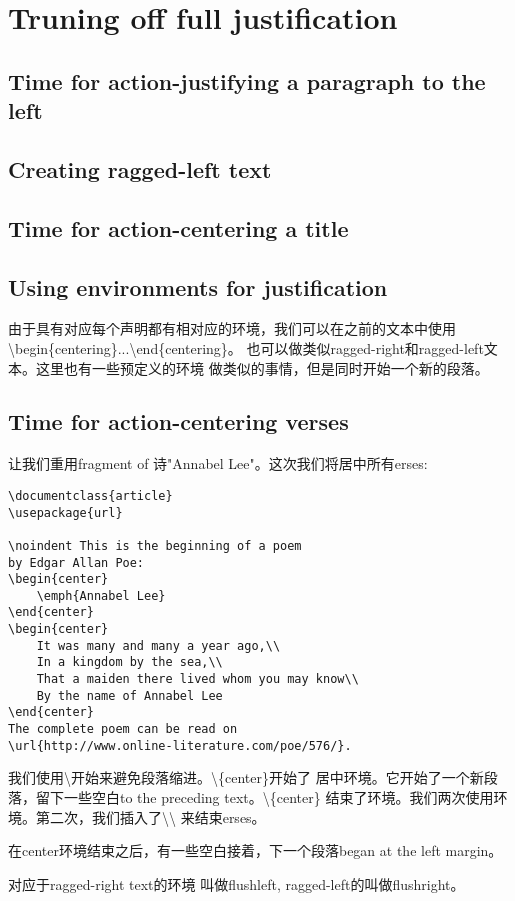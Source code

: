 \section{Truning off full justification}
	\subsection{Time for action-justifying a paragraph to the left}
	\subsection{Creating ragged-left text}
	\subsection{Time for action-centering a title}
	\subsection{Using environments for justification}
由于具有对应每个声明都有相对应的环境，我们可以在之前的文本中使用
\textbackslash begin\{centering\}...\textbackslash end\{centering\}。
也可以做类似ragged-right和ragged-left文本。这里也有一些预定义的环境
做类似的事情，但是同时开始一个新的段落。
	\subsection{Time for action-centering verses}
让我们重用fragment of 诗"Annabel Lee"。这次我们将居中所有erses:
\begin{lstlisting}[language={[LaTeX]TeX}]
\documentclass{article}
\usepackage{url}

\noindent This is the beginning of a poem
by Edgar Allan Poe:
\begin{center}
	\emph{Annabel Lee}
\end{center}
\begin{center}
	It was many and many a year ago,\\
	In a kingdom by the sea,\\
	That a maiden there lived whom you may know\\
	By the name of Annabel Lee
\end{center}
The complete poem can be read on
\url{http://www.online-literature.com/poe/576/}.

\end{lstlisting}
我们使用\textbackslash 开始来避免段落缩进。\textbackslash \{center\}开始了
居中环境。它开始了一个新段落，留下一些空白to the preceding text。\textbackslash \{center\}
结束了环境。我们两次使用环境。第二次，我们插入了\textbackslash \textbackslash
来结束erses。

在center环境结束之后，有一些空白接着，下一个段落began at the left margin。

对应于ragged-right text的环境
叫做flushleft,
ragged-left的叫做flushright。

